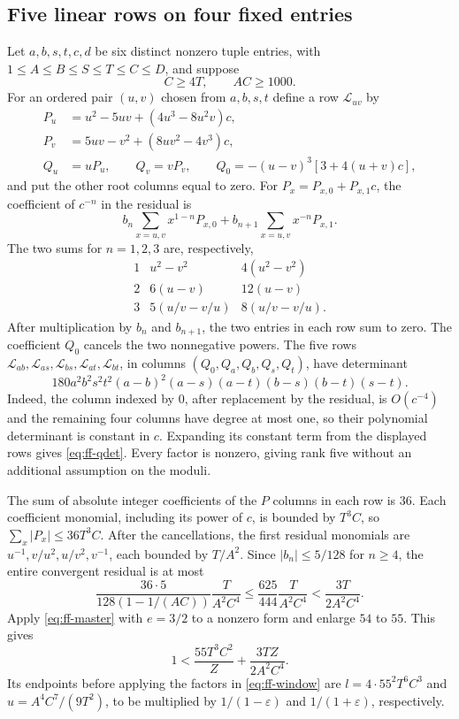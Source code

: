\documentclass[12pt]{article}
\numberwithin{equation}{section}
\begin{document}
\subsection{Five linear rows on four fixed entries}

Let $a,b,s,t,c,d$ be six distinct nonzero tuple entries, with
$1\le A\le B\le S\le T\le C\le D$, and suppose
\begin{equation*}
 C\ge4T,\qquad AC\ge1000.
\end{equation*}
For an ordered pair $(u,v)$ chosen from $a,b,s,t$ define a row $\mathcal L_{uv}$ by
\begin{align*}
 P_u&=u^2-5uv+(4u^3-8u^2v)c,\\
 P_v&=5uv-v^2+(8uv^2-4v^3)c,\\
 Q_u&=uP_u,\qquad Q_v=vP_v,\qquad
 Q_0=-(u-v)^3[3+4(u+v)c],
\end{align*}
and put the other root columns equal to zero.
For $P_x=P_{x,0}+P_{x,1}c$, the coefficient of $c^{-n}$ in the
residual is
\[
 b_n\sum_{x=u,v}x^{1-n}P_{x,0}
 +b_{n+1}\sum_{x=u,v}x^{-n}P_{x,1}.
\]
The two sums for $n=1,2,3$ are, respectively,
\[
 \begin{array}{c|cc}
 1&u^2-v^2&4(u^2-v^2)\\
 2&6(u-v)&12(u-v)\\
 3&5(u/v-v/u)&8(u/v-v/u).
 \end{array}
\]
After multiplication by $b_n$ and $b_{n+1}$, the two entries in each row sum to zero. The coefficient $Q_0$ cancels the two nonnegative powers.
The five rows
$\mathcal L_{ab},\mathcal L_{as},\mathcal L_{bs},
\mathcal L_{at},\mathcal L_{bt}$, in columns $(Q_0,Q_a,Q_b,Q_s,Q_t)$,
have determinant
\begin{equation}\label{eq:ff-qdet}
 180a^2b^2s^2t^2(a-b)^2(a-s)(a-t)(b-s)(b-t)(s-t).
\end{equation}
Indeed, the column indexed by $0$, after replacement by the residual, is $O(c^{-4})$ and the remaining four columns have degree at most one, so their polynomial determinant is
constant in $c$. Expanding its constant term from the displayed rows
gives \eqref{eq:ff-qdet}. Every factor is nonzero, giving rank five
without an additional assumption on the moduli.

The sum of absolute integer coefficients of the $P$ columns in each
row is $36$. Each coefficient monomial, including its power of $c$,
is bounded by $T^3C$, so $\sum_x|P_x|\le36T^3C$.
After the cancellations, the first residual monomials are
$u^{-1},v/u^2,u/v^2,v^{-1}$, each bounded by $T/A^2$.
Since $|b_n|\le5/128$ for $n\ge4$, the entire convergent residual is
at most
\[
 \frac{36\cdot5}{128(1-1/(AC))}\frac{T}{A^2C^4}
 \le\frac{625}{444}\frac{T}{A^2C^4}
 <\frac{3T}{2A^2C^4}.
\]
Apply \eqref{eq:ff-master} with $e=3/2$ to a nonzero form and enlarge
$54$ to $55$. This gives
\begin{equation*}
 1<\frac{55T^3C^2}{Z}+\frac{3TZ}{2A^2C^4}.
\end{equation*}
Its endpoints before applying the factors in \eqref{eq:ff-window} are
$l=4\cdot55^2T^6C^3$ and $u=A^4C^7/(9T^2)$, to be multiplied by $1/(1-\varepsilon)$ and $1/(1+\varepsilon)$, respectively.
\end{document}
